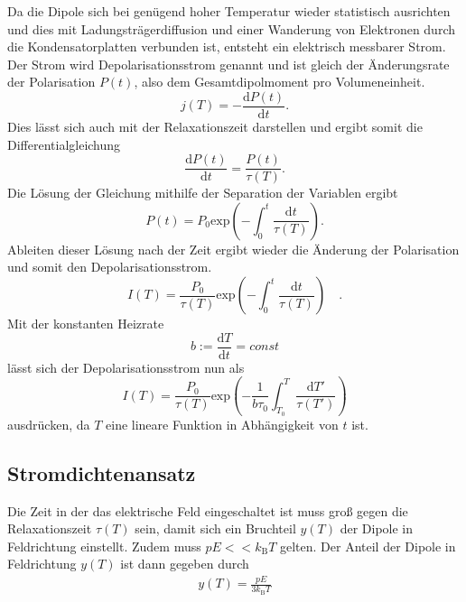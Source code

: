 Da die Dipole sich bei genügend hoher Temperatur wieder statistisch ausrichten und dies mit Ladungsträgerdiffusion und einer Wanderung
von Elektronen durch die Kondensatorplatten verbunden ist,
entsteht ein elektrisch messbarer Strom.
Der Strom wird Depolarisationsstrom genannt und ist gleich der Änderungsrate der 
Polarisation $P(t)$, also dem Gesamtdipolmoment pro Volumeneinheit.
\begin{equation}
    j(T) = - \frac{\text{d}P(t)}{\text{d}t}.
\end{equation}
Dies lässt sich auch mit der Relaxationszeit darstellen und ergibt somit die Differentialgleichung
\begin{equation}
    \frac{\text{d} P(t)}{\text{d} t} = \frac{P(t)}{\tau(T)}.
    \label{eqn:diff}
\end{equation}
Die Lösung der Gleichung mithilfe der Separation der Variablen ergibt
\begin{equation}
    P(t) = P_0 \text{exp}\left(-\int_0^t\frac{\text{d}t}{\tau(T)}\right).
\end{equation}
Ableiten dieser Lösung nach der Zeit ergibt wieder die Änderung der Polarisation und somit den 
Depolarisationsstrom.
\begin{equation}
    I(T) = \frac{P_0}{\tau(T)} \text{exp}\left(-\int_0^t\frac{\text{d}t}{\tau(T)}\right) \quad.
    \end{equation}
Mit der konstanten Heizrate
\begin{equation}
    b := \frac{\text{d}T}{\text{d}t} = const
\end{equation}
lässt sich der Depolarisationsstrom nun als 
\begin{equation}
    I(T) = \frac{P_0}{\tau(T)} \text{exp}\left(-\frac{1}{b\tau_0}\int_{T_0}^T\frac{\text{d}T'}{\tau(T')}\right)
\end{equation}
ausdrücken, da $T$ eine lineare Funktion in Abhängigkeit von $t$ ist.

\subsection{Stromdichtenansatz}
\label{subsec:Stromdichte}

Die Zeit in der das elektrische Feld eingeschaltet ist muss groß gegen die Relaxationszeit $\tau(T)$ sein, 
damit sich ein Bruchteil $y(T)$ der Dipole in Feldrichtung einstellt.
Zudem muss $pE << k_\text{B}T$ gelten.
Der Anteil der Dipole in Feldrichtung $y(T)$ ist dann gegeben durch
\begin{align*}
    y(T)= \frac{pE}{3 k_\text{B}T}
\end{align*}

